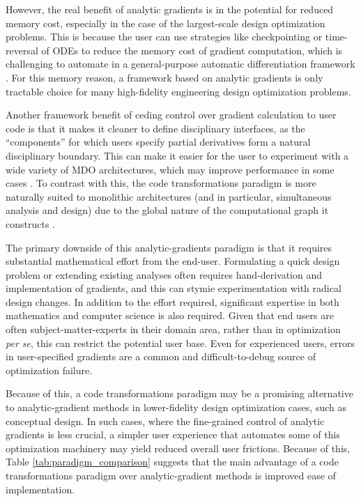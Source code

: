 However, the real benefit of analytic gradients is in the potential for reduced memory cost, especially in the case of the largest-scale design optimization problems. This is because the user can use strategies like checkpointing or time-reversal of ODEs to reduce the memory cost of gradient computation, which is challenging to automate in a general-purpose automatic differentiation framework \cite{chen2018neural, rackauckas_direct_2022, griewank_algorithm_2000}. For this memory reason, a framework based on analytic gradients is only tractable choice for many high-fidelity engineering design optimization problems.

Another framework benefit of ceding control over gradient calculation to user code is that it makes it cleaner to define disciplinary interfaces, as the ``components'' for which users specify partial derivatives form a natural disciplinary boundary. This can make it easier for the user to experiment with a wide variety of MDO architectures, which may improve performance in some cases \cite{martins_multidisciplinary_2013}. To contrast with this, the code transformations paradigm is more naturally suited to monolithic architectures (and in particular, simultaneous analysis and design) due to the global nature of the computational graph it constructs \cite{ma_modelingtoolkit_2021, haftka_simultaneous_1985}.

The primary downside of this analytic-gradients paradigm is that it requires substantial mathematical effort from the end-user. Formulating a quick design problem or extending existing analyses often requires hand-derivation and implementation of gradients, and this can stymie experimentation with radical design changes. In addition to the effort required, significant expertise in both mathematics and computer science is also required. Given that end users are often subject-matter-experts in their domain area, rather than in optimization \emph{per se}, this can restrict the potential user base. Even for experienced users, errors in user-specified gradients are a common and difficult-to-debug source of optimization failure.



Because of this, a code transformations paradigm may be a promising alternative to analytic-gradient methods in lower-fidelity design optimization cases, such as conceptual design. In such cases, where the fine-grained control of analytic gradients is less crucial, a simpler user experience that automates some of this optimization machinery may yield reduced overall user frictions. Because of this, Table \ref{tab:paradigm_comparison} suggests that the main advantage of a code transformations paradigm over analytic-gradient methods is improved ease of implementation.

